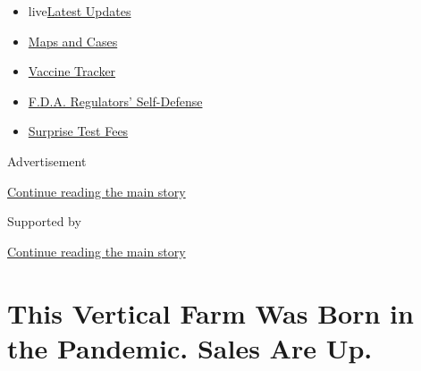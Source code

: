 \begin{itemize}
\tightlist
\item
  live\href{https://www.nytimes3xbfgragh.onion/2020/09/12/world/covid-19-coronavirus.html?name=styln-coronavirus-national\&region=TOP_BANNER\&block=storyline_menu_recirc\&action=click\&pgtype=Article\&impression_id=ac6e7e31-f52c-11ea-943d-89ef8ebe8e9e\&variant=undefined}{Latest
  Updates}
\item
  \href{https://www.nytimes3xbfgragh.onion/interactive/2020/us/coronavirus-us-cases.html?name=styln-coronavirus-national\&region=TOP_BANNER\&block=storyline_menu_recirc\&action=click\&pgtype=Article\&impression_id=ac6ea540-f52c-11ea-943d-89ef8ebe8e9e\&variant=undefined}{Maps
  and Cases}
\item
  \href{https://www.nytimes3xbfgragh.onion/interactive/2020/science/coronavirus-vaccine-tracker.html?name=styln-coronavirus-national\&region=TOP_BANNER\&block=storyline_menu_recirc\&action=click\&pgtype=Article\&impression_id=ac6ea541-f52c-11ea-943d-89ef8ebe8e9e\&variant=undefined}{Vaccine
  Tracker}
\item
  \href{https://www.nytimes3xbfgragh.onion/2020/09/10/us/politics/fda-coronavirus-vaccine.html?name=styln-coronavirus-national\&region=TOP_BANNER\&block=storyline_menu_recirc\&action=click\&pgtype=Article\&impression_id=ac6ea542-f52c-11ea-943d-89ef8ebe8e9e\&variant=undefined}{F.D.A.
  Regulators' Self-Defense}
\item
  \href{https://www.nytimes3xbfgragh.onion/2020/09/09/upshot/coronavirus-surprise-test-fees.html?name=styln-coronavirus-national\&region=TOP_BANNER\&block=storyline_menu_recirc\&action=click\&pgtype=Article\&impression_id=ac6ea543-f52c-11ea-943d-89ef8ebe8e9e\&variant=undefined}{Surprise
  Test Fees}
\end{itemize}

Advertisement

\protect\hyperlink{after-top}{Continue reading the main story}

Supported by

\protect\hyperlink{after-sponsor}{Continue reading the main story}

\hypertarget{this-vertical-farm-was-born-in-the-pandemic-sales-are-up}{%
\section{This Vertical Farm Was Born in the Pandemic. Sales Are
Up.}\label{this-vertical-farm-was-born-in-the-pandemic-sales-are-up}}

